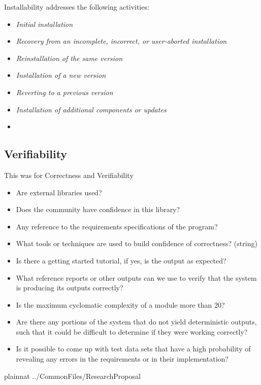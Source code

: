 \documentclass{article}
\begin{document}
Installability addresses the following activities:
\begin{itemize}

\item \textit{Initial installation}
\item \textit{Recovery from an incomplete, incorrect, or user-aborted installation}
\item \textit{Reinstallation of the same version}
\item \textit{Installation of a new version}
\item \textit{Reverting to a previous version}
\item \textit{Installation of additional components or updates}
\item \textit{
}
\end{itemize}

\subsection{Verifiability}

\citep{SmithEtAl2018}
This was for Correctness and Verifiability
\begin{itemize}
	\item Are external libraries used? 
	\item Does the community have confidence in this library? 
	\item Any reference to the requirements specifications of the program?
	\item What tools or techniques are used to build confidence of correctness? (string)
	\item Is there a getting started tutorial, if yes, is the output as expected?
\end{itemize}
\citep{wiegers2003softreq}
\begin{itemize}
	\item What reference reports or other outputs can we use to verify that the system is producing its outputs correctly?
	\item Is the maximum cyclomatic complexity of a module more than 20?
	\item Are there any portions of the system that do not yield deterministic outputs, such that it could be difficult to determine if they were working correctly?
	\item Is it possible to come up with test data sets that have a high probability of revealing any errors in the requirements or in their implementation?
\end{itemize}


 {plainnat}
 {../CommonFiles/ResearchProposal}
\end{document}
